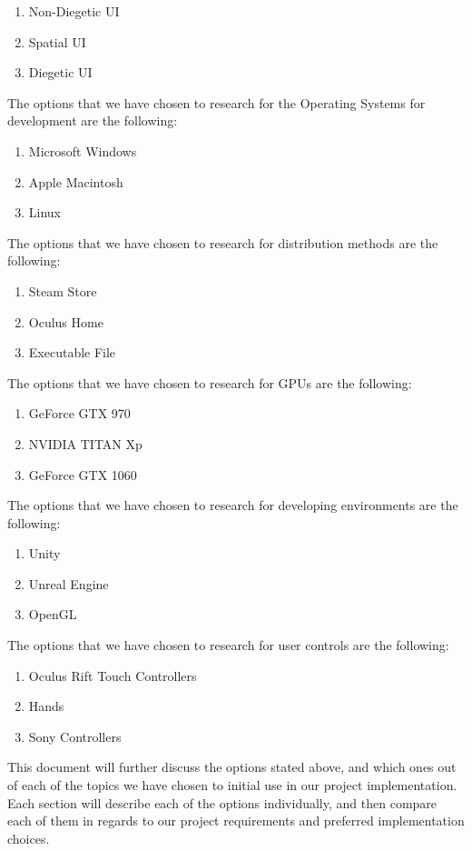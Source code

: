 \documentclass[letterpaper,10pt,onecolumn,compsoc]{IEEEtran}
\begin{document}
\begin{enumerate}
 	\item Non-Diegetic UI
 	\item Spatial UI
 	\item Diegetic UI
\end{enumerate}
\noindent
The options that we have chosen to research for the Operating Systems for development are the following:
\begin{enumerate}
 	\item Microsoft Windows
 	\item Apple Macintosh
 	\item Linux
\end{enumerate}
\newpage
\noindent
The options that we have chosen to research for distribution methods are the following:
\begin{enumerate}
 	\item Steam Store
 	\item Oculus Home
 	\item Executable File
\end{enumerate}
\noindent
The options that we have chosen to research for GPUs are the following:
\begin{enumerate}
 	\item GeForce GTX 970 
 	\item NVIDIA TITAN Xp
 	\item GeForce GTX 1060
\end{enumerate}
\noindent
The options that we have chosen to research for developing environments are the following:
\begin{enumerate}
 	\item Unity
 	\item Unreal Engine
 	\item OpenGL
\end{enumerate}
\noindent
The options that we have chosen to research for user controls are the following:
\begin{enumerate}
 	\item Oculus Rift Touch Controllers
 	\item Hands
 	\item Sony Controllers
\end{enumerate}
This document will further discuss the options stated above, and which ones out of each of the topics we have chosen to initial use in our project implementation. Each section will describe each of the options individually, and then compare each of them in regards to our project requirements and preferred implementation choices.
\end{document}
